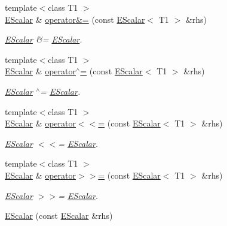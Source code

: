 \begin{DoxyCompactItemize}
{\footnotesize template$<$class T1 $>$ }\\\mbox{\hyperlink{classENSEM_1_1EScalar}{E\+Scalar}} \& \mbox{\hyperlink{classENSEM_1_1EScalar_a4e16e2cecacdfefd6f01dcc360c6945b}{operator\&=}} (const \mbox{\hyperlink{classENSEM_1_1EScalar}{E\+Scalar}}$<$ T1 $>$ \&rhs)
\begin{DoxyCompactList}\small\item\em \mbox{\hyperlink{classENSEM_1_1EScalar}{E\+Scalar}} \&= \mbox{\hyperlink{classENSEM_1_1EScalar}{E\+Scalar}}. \end{DoxyCompactList}\item 
{\footnotesize template$<$class T1 $>$ }\\\mbox{\hyperlink{classENSEM_1_1EScalar}{E\+Scalar}} \& \mbox{\hyperlink{classENSEM_1_1EScalar_a42c2a63d2eda81643ae8145068db3a8e}{operator$^\wedge$=}} (const \mbox{\hyperlink{classENSEM_1_1EScalar}{E\+Scalar}}$<$ T1 $>$ \&rhs)
\begin{DoxyCompactList}\small\item\em \mbox{\hyperlink{classENSEM_1_1EScalar}{E\+Scalar}} $^\wedge$= \mbox{\hyperlink{classENSEM_1_1EScalar}{E\+Scalar}}. \end{DoxyCompactList}\item 
{\footnotesize template$<$class T1 $>$ }\\\mbox{\hyperlink{classENSEM_1_1EScalar}{E\+Scalar}} \& \mbox{\hyperlink{classENSEM_1_1EScalar_a29ea96dc5698e4541307d65a0f1dfe6e}{operator$<$$<$=}} (const \mbox{\hyperlink{classENSEM_1_1EScalar}{E\+Scalar}}$<$ T1 $>$ \&rhs)
\begin{DoxyCompactList}\small\item\em \mbox{\hyperlink{classENSEM_1_1EScalar}{E\+Scalar}} $<$$<$= \mbox{\hyperlink{classENSEM_1_1EScalar}{E\+Scalar}}. \end{DoxyCompactList}\item 
{\footnotesize template$<$class T1 $>$ }\\\mbox{\hyperlink{classENSEM_1_1EScalar}{E\+Scalar}} \& \mbox{\hyperlink{classENSEM_1_1EScalar_a0e520529327800038c3775d195819b6f}{operator$>$$>$=}} (const \mbox{\hyperlink{classENSEM_1_1EScalar}{E\+Scalar}}$<$ T1 $>$ \&rhs)
\begin{DoxyCompactList}\small\item\em \mbox{\hyperlink{classENSEM_1_1EScalar}{E\+Scalar}} $>$$>$= \mbox{\hyperlink{classENSEM_1_1EScalar}{E\+Scalar}}. \end{DoxyCompactList}\item 
\mbox{\hyperlink{classENSEM_1_1EScalar_a002ac4bc9bc6e5ad476613e4edaa827a}{E\+Scalar}} (const \mbox{\hyperlink{classENSEM_1_1EScalar}{E\+Scalar}} \&rhs)

\end{DoxyCompactItemize}
